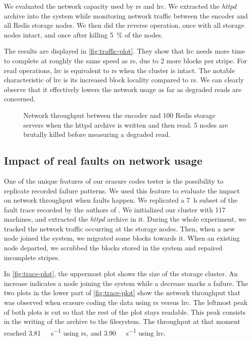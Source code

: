 We evaluated the network capacity used by \ac{rs} and \ac{lrc}.
We extracted the \textit{httpd} archive into the system while monitoring network traffic between the encoder and all Redis storage nodes.
We then did the reverse operation, once with all storage nodes intact, and once after killing \SI{5}{\percent} of the nodes.

The results are displayed in \autoref{fig:traffic-plot}.
They show that \ac{lrc} needs more time to complete at roughly the same speed as \ac{rs}, due to 2 more blocks per stripe.
For read operations, \ac{lrc} is equivalent to \ac{rs} when the cluster is intact.
The notable characteristic of \ac{lrc} is its increased block locality compared to \ac{rs}.
We can clearly observe that it effectively lowers the network usage as far as degraded reads are concerned.
\begin{figure*}
    \centering
    
    \caption{Network throughput between the encoder and 100 Redis storage servers when the httpd archive is written and then read. 5 nodes are brutally killed before measuring a degraded read.}
    \label{fig:traffic-plot}
\end{figure*}



\subsection{Impact of real faults on network usage}
\label{subsec:fault-trace}

One of the unique features of our erasure codes tester is the possibility to replicate recorded failure patterns.
We used this feature to evaluate the impact on network throughput when faults happen.
We replicated a \SI{7}{\hour} subset of the fault trace recorded by the authors of \autocite{websites02}.
We initialized our cluster with 117 machines, and extracted the \textit{httpd} archive in it.
During the whole experiment, we tracked the network traffic occurring at the storage nodes.
Then, when a new node joined the system, we migrated some blocks towards it.
When an existing node departed, we scrubbed the blocks stored in the system and repaired incomplete stripes.

In \autoref{fig:trace-plot}, the uppermost plot shows the size of the storage cluster.
An increase indicates a node joining the system while a decrease marks a failure.
The two plots in the lower part of \autoref{fig:trace-plot} show the network throughput that was observed when erasure coding the data using \ac{rs} versus \ac{lrc}.
The leftmost peak of both plots is cut so that the rest of the plot stays 
readable.
This peak consists in the writing of the archive to the filesystem.
The throughput at that moment reached \SI{3.81}{\mega\byte\per\second} using 
\ac{rs}, and \SI{3.90}{\mega\byte\per\second} using \ac{lrc}.

